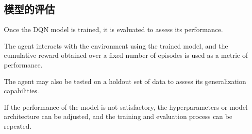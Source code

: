 \subsection{模型的评估}

Once the DQN model is trained, it is evaluated to assess its performance.

The agent interacts with the environment using the trained model, and the cumulative reward obtained over a fixed number of episodes is used as a metric of performance.

The agent may also be tested on a holdout set of data to assess its generalization capabilities.

If the performance of the model is not satisfactory, the hyperparameters or model architecture can be adjusted, and the training and evaluation process can be repeated.